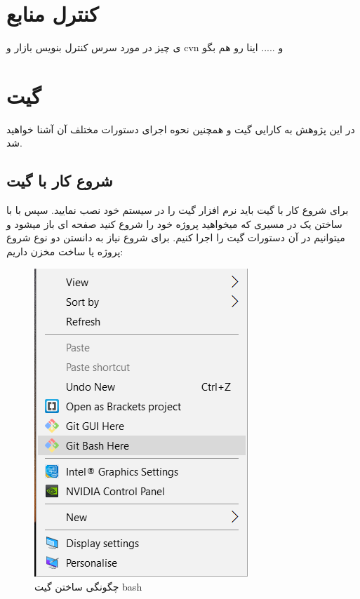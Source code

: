 \section{کنترل منابع }
ی چیز در مورد سرس کنترل بنویس بازار و cvn و ..... اینا رو هم بگو 



\section{گیت }
در این پژوهش به کارایی گیت و همچنین نحوه اجرای دستورات مختلف آن آشنا خواهید شد.
\subsection{شروع کار با گیت}
برای شروع کار با گیت باید نرم افزار گیت را در سیستم خود نصب نمایید.
سپس با با ساختن یک  در مسیری که میخواهید پروژه خود را شروع کنید صفحه ای باز میشود و میتوانیم در آن دستورات گیت را اجرا کنیم. برای شروع نیاز به دانستن دو نوع شروع پروژه یا ساخت مخزن داریم:
\begin{figure}[tbh]
	\centering
	\includegraphics{./Figures/GitBash}
	\caption{ چگونگی ساختن گیت bash  }
	\label{Fig:GitBash}
\end{figure}
